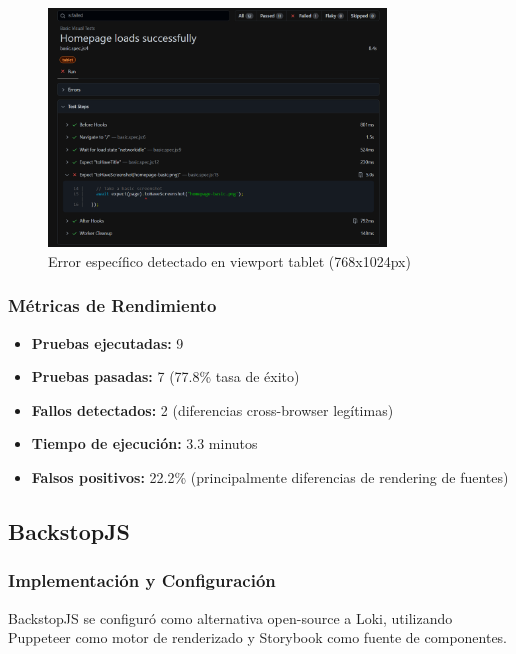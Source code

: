 \documentclass{article}
\begin{document}
\begin{figure}[H]
\centering
\includegraphics[width=0.8\textwidth]{playwright/2ErrorTablet.png}
\caption{Error específico detectado en viewport tablet (768x1024px)}
\label{fig:playwright-tablet-error}
\end{figure}

\subsubsection{Métricas de Rendimiento}
\begin{itemize}[nosep]
\item \textbf{Pruebas ejecutadas:} 9
\item \textbf{Pruebas pasadas:} 7 (77.8\% tasa de éxito)
\item \textbf{Fallos detectados:} 2 (diferencias cross-browser legítimas)
\item \textbf{Tiempo de ejecución:} 3.3 minutos
\item \textbf{Falsos positivos:} 22.2\% (principalmente diferencias de rendering de fuentes)
\end{itemize}

\subsection{BackstopJS}

\subsubsection{Implementación y Configuración}
BackstopJS se configuró como alternativa open-source a Loki, utilizando Puppeteer como motor de renderizado y Storybook como fuente de componentes.
\end{document}
